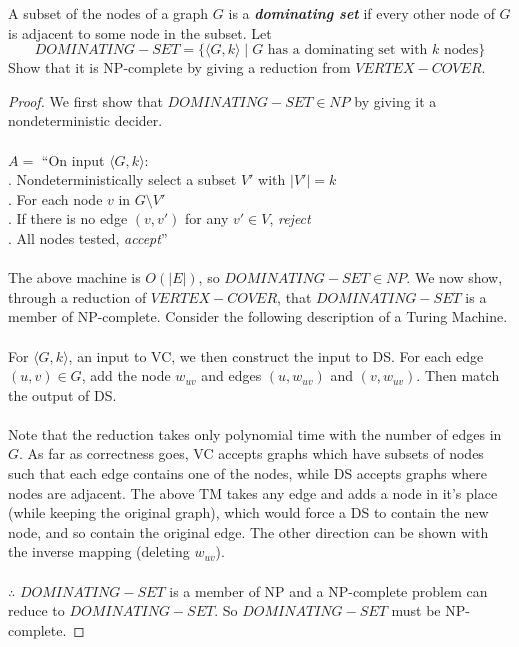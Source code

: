 \documentclass[11pt]{article}
\begin{document}
A subset of the nodes of a graph $G$ is a \textbf{\textit{dominating set}} if every other node of $G$ is adjacent to some node in the subset. Let
$$ DOMINATING-SET = \{ \langle G, k \rangle \mid G \text{ has a dominating set with } k \text{ nodes} \}$$
Show that it is NP-complete by giving a reduction from $VERTEX-COVER$.
\begin{proof}
We first show that $DOMINATING-SET \in NP$ by giving it a nondeterministic decider.\\\\
$A = $ ``On input $ \langle G, k \rangle $: \\
. Nondeterministically select a subset $V'$ with $|V'| = k$ \\
. For each node $v$ in $ G \setminus V'$ \\
. \indent If there is no edge $ (v, v')$ for any $v' \in V$, \textit{reject} \\
. All nodes tested, \textit{accept}''\\\\
The above machine is $O(|E|)$, so $DOMINATING-SET \in NP$. We now show, through a reduction of $VERTEX-COVER$, that $DOMINATING-SET$ is a member of NP-complete. Consider the following description of a Turing Machine.\\\\
For $ \langle G, k \rangle $, an input to VC, we then construct the input to DS. For each edge $(u,v) \in G$, add the node $w_{uv}$ and edges $ (u, w_{uv})$ and $(v, w_{uv})$. Then match the output of DS.\\\\
Note that the reduction takes only polynomial time with the number of edges in $G$. As far as correctness goes, VC accepts graphs which have subsets of nodes such that each edge contains one of the nodes, while DS accepts graphs where nodes are adjacent. The above TM takes any edge and adds a node in it's place (while keeping the original graph), which would force a DS to contain the new node, and so contain the original edge. The other direction can be shown with the inverse mapping (deleting $w_{uv}$).\\\\
$\therefore$ $DOMINATING-SET$ is a member of NP and a NP-complete problem can reduce to $DOMINATING-SET$. So $DOMINATING-SET$ must be NP-complete.
\end{proof}
\end{document}
